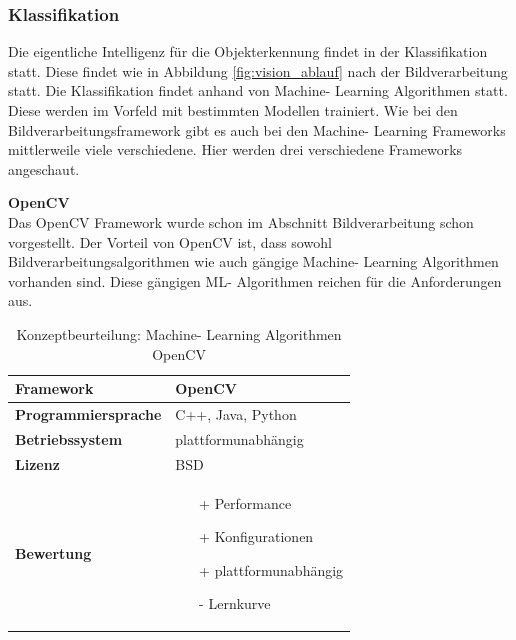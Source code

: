 \documentclass[../../main.tex]{subfiles}
\begin{document}
        \vspace{0.5cm}
        \subsubsection{Klassifikation}
        Die eigentliche Intelligenz für die Objekterkennung findet in der Klassifikation statt. Diese findet wie in Abbildung \ref{fig:vision_ablauf} nach der Bildverarbeitung statt. Die Klassifikation findet anhand von Machine- Learning Algorithmen statt. Diese werden im Vorfeld mit bestimmten Modellen trainiert. Wie bei den Bildverarbeitungsframework gibt es auch bei den Machine- Learning Frameworks mittlerweile viele verschiedene. Hier werden drei verschiedene Frameworks angeschaut.\\
        \pagebreak


        \textbf{OpenCV}\\
        Das OpenCV Framework wurde schon im Abschnitt Bildverarbeitung schon vorgestellt. Der Vorteil von OpenCV ist, dass sowohl Bildverarbeitungsalgorithmen wie auch gängige Machine- Learning Algorithmen vorhanden sind. Diese gängigen ML- Algorithmen reichen für die Anforderungen aus.
        \begin{flushleft}
            \begin{table}[h]
            \begin{tabular}{ | l | p{11cm} |}
            \hline
            \textbf{Framework} & OpenCV \\ \hline
            \textbf{Programmiersprache} & C++, Java, Python \\ \hline
            \textbf{Betriebssystem} & plattformunabhängig \\ \hline
            \textbf{Lizenz} & BSD \\ \hline
            \textbf{Bewertung} &  \begin{itemize}
                                    \item[+] Performance
                                    \item[+] Konfigurationen
                                    \item[+] plattformunabhängig 
                                    \item[-] Lernkurve
                                  \end{itemize} \\ \hline
            \end{tabular}
            \caption{Konzeptbeurteilung: Machine- Learning Algorithmen OpenCV}
            \label{tab:konzept_ML_OpenCV}
            \end{table}
        \end{flushleft}
        \vspace{1cm}
\end{document}
